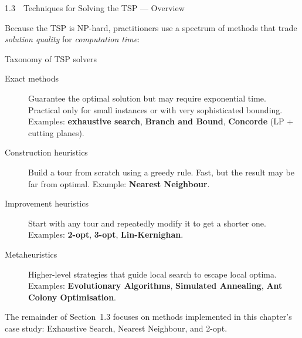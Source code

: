\documentclass[aspectratio=169,10pt]{beamer}
\begin{document}
\begin{frame}[allowframebreaks]{1.3~~Techniques for Solving the TSP — Overview}

  Because the TSP is NP-hard, practitioners use a spectrum of methods
  that trade \emph{solution quality} for \emph{computation time}:

  \begin{block}{Taxonomy of TSP solvers}
    \begin{description}
      \item[Exact methods] Guarantee the optimal solution but may require
        exponential time.  Practical only for small instances or with
        very sophisticated bounding.  Examples: \textbf{exhaustive
        search}, \textbf{Branch and Bound}, \textbf{Concorde} (LP + cutting
        planes).
      \item[Construction heuristics] Build a tour from scratch using a
        greedy rule.  Fast, but the result may be far from optimal.
        Example: \textbf{Nearest Neighbour}.
      \item[Improvement heuristics] Start with any tour and repeatedly
        modify it to get a shorter one.  Examples: \textbf{2-opt},
        \textbf{3-opt}, \textbf{Lin-Kernighan}.
      \item[Metaheuristics] Higher-level strategies that guide local
        search to escape local optima.  Examples: \textbf{Evolutionary
        Algorithms}, \textbf{Simulated Annealing}, \textbf{Ant Colony
        Optimisation}.
    \end{description}
  \end{block}

  The remainder of Section~1.3 focuses on methods implemented in this
  chapter's case study: Exhaustive Search, Nearest Neighbour, and 2-opt.

\end{frame}
\end{document}
